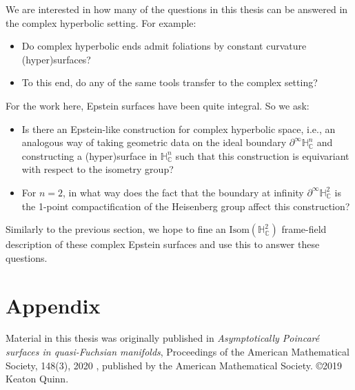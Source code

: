 \documentclass{amsart}
\newcommand{\C}{\mathbb{C}}
\renewcommand{\H}{\mathbb{H}}
\begin{document}
We are interested in how many of the questions in this thesis can be answered in the complex hyperbolic setting. For example:
\begin{itemize}
\item Do complex hyperbolic ends admit foliations by constant curvature (hyper)surfaces?
\item To this end, do any of the same tools transfer to the complex setting? 
\end{itemize}
For the work here, Epstein surfaces have been quite integral. So we ask:
\begin{itemize}
\item Is there an Epstein-like construction for complex hyperbolic space, i.e., an analogous way of taking geometric data on the ideal boundary $\partial^\infty \H_{\C}^n$ and constructing a (hyper)surface in $\H_{\C}^n$ such that this construction is equivariant with respect to the isometry group? 
\item For $n=2$, in what way does the fact that the boundary at infinity $\partial^\infty \H_{\C}^2$ is the 1-point compactification of the Heisenberg group affect this construction?
\end{itemize}
Similarly to the previous section, we hope to fine an $\mathrm{Isom}(\H_{\C}^2)$ frame-field description of these complex Epstein surfaces and use this to answer these questions. 

\appendix
\section*{Appendix}

Material in this thesis was originally published in \emph{Asymptotically Poincaré surfaces in quasi-Fuchsian manifolds}, Proceedings of the American Mathematical Society, 148(3), 2020 \cite{quinn2020}, published by the American Mathematical Society. \copyright 2019 Keaton Quinn.





\end{document}

